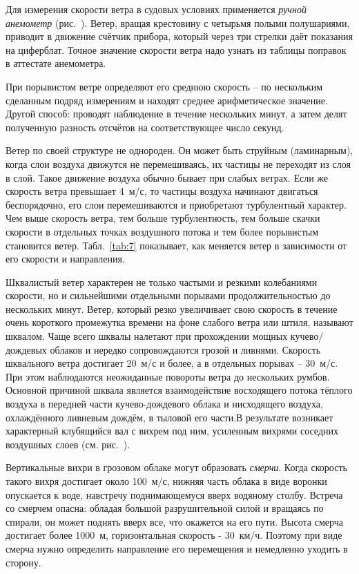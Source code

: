 Для измерения скорости ветра в судовых условиях применяется
\textit{ручной анемометр} (рис.~). Ветер,
вращая крестовину с четырьмя полыми полушариями, приводит в движение
счётчик прибора, который через три стрелки даёт показания на
циферблат. Точное значение скорости ветра надо узнать из таблицы
поправок в аттестате анемометра.

При порывистом ветре определяют его среднюю скорость \--- по
нескольким сделанным подряд измерениям и находят среднее
арифметическое значение. Другой способ: проводят наблюдение в течение
нескольких минут, а затем делят полученную разность отсчётов на
соответствующее число секунд.

Ветер по своей структуре не однороден. Он может быть струйным
(ламинарным), когда слои воздуха движутся не перемешиваясь, их частицы
не переходят из слоя в слой. Такое движение воздуха обычно бывает при
слабых ветрах. Если же скорость ветра превышает 4~м/с, то частицы
воздуха начинают двигаться беспорядочно, его слои перемешиваются и
приобретают турбулентный характер. Чем выше скорость ветра, тем больше
турбулентность, тем больше скачки скорости в отдельных точках
воздушного потока и тем более порывистым становится
ветер. Табл.~\ref{tab:7} показывает, как меняется ветер в зависимости
от его скорости и направления.

Шквалистый ветер характерен не только частыми и резкими колебаниями
скорости, но и сильнейшими отдельными порывами продолжительностью до
нескольких минут. Ветер, который резко увеличивает свою скорость в
течение очень короткого промежутка времени на фоне слабого ветра или
штиля, называют шквалом. Чаще всего
шквалы налетают при прохождении мощных кучево\-/дождевых облаков и
нередко сопровождаются грозой и ливнями. Скорость шквального ветра
достигает 20~м/с и более, а в отдельных порывах \--- 30~м/с. При этом наблюдаются неожиданные повороты ветра до нескольких
румбов. Основной причиной шквала является взаимодействие восходящего
потока тёплого воздуха в передней части кучево-дождевого облака и
нисходящего воздуха, охлаждённого ливневым дождём, в тыловой его
части.В результате возникает характерный клубящийся вал с вихрем под
ним, усиленным вихрями соседних воздушных слоев (см. рис.~).

Вертикальные вихри в грозовом облаке могут образовать
\textit{смерчи}. Когда скорость такого
вихря достигает около 100~м/с, нижняя часть облака в виде воронки
опускается к воде, навстречу поднимающемуся вверх водяному
столбу. Встреча со смерчем опасна: обладая большой разрушительной
силой и вращаясь по спирали, он может поднять вверх все, что окажется
на его пути. Высота смерча достигает более 1000~м, горизонтальная
скорость \-- 30~км/ч. Поэтому при виде смерча нужно определить
направление его перемещения и немедленно уходить в сторону.

